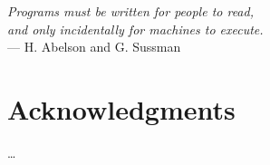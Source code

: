 
\begin{flushright}{\slshape
    Programs must be written for people to read, \\
    and only incidentally for machines to execute.} \\ \medskip
    --- H. Abelson and G. Sussman
\end{flushright}

\bigskip

\begingroup
\let\clearpage\relax
\let\cleardoublepage\relax
\let\cleardoublepage\relax
\chapter*{Acknowledgments}
\ldots
\endgroup
